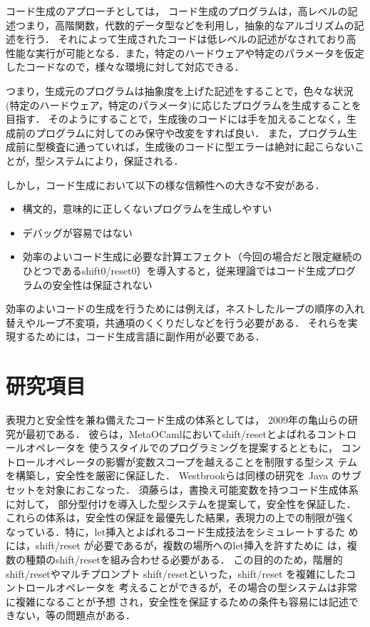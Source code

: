 \documentclass[10pt,a4j,twocolumn]{jarticle}
\theoremstyle{definition}
\begin{document}
コード生成のアプローチとしては，
コード生成のプログラムは，高レベルの記述つまり，高階関数，代数的データ型などを利用し，抽象的なアルゴリズムの記述を行う．
それによって生成されたコードは低レベルの記述がなされており高性能な実行が可能となる．また，特定のハードウェアや特定のパラメータを仮定したコードなので，様々な環境に対して対応できる．

つまり，生成元のプログラムは抽象度を上げた記述をすることで，色々な状況(特定のハードウェア，特定のパラメータ)に応じたプログラムを生成することを目指す．
そのようにすることで，生成後のコードには手を加えることなく，生成前のプログラムに対してのみ保守や改変をすれば良い．
また，プログラム生成前に型検査に通っていれば，生成後のコードに型エラーは絶対に起こらないことが，型システムにより，保証される．

しかし，コード生成において以下の様な信頼性への大きな不安がある．

\begin{itemize}
\item 構文的，意味的に正しくないプログラムを生成しやすい
\item デバッグが容易ではない
\item 効率のよいコード生成に必要な計算エフェクト（今回の場合だと限定継続のひとつであるshift0/reset0）を導入すると，従来理論ではコード生成プログラムの安全性は保証されない
\end{itemize}

効率のよいコードの生成を行うためには例えば，ネストしたループの順序の入れ替えやループ不変項，共通項のくくりだしなどを行う必要がある．
それらを実現するためには，コード生成言語に副作用が必要である．

\section{研究項目}
表現力と安全性を兼ね備えたコード生成の体系としては，
2009年の亀山らの研究\cite{Kameyama2009}が最初である．
彼らは，MetaOCamlにおいてshift/resetとよばれるコントロールオペレータを
使うスタイルでのプログラミングを提案するとともに，
コントロールオペレータの影響が変数スコープを越えることを制限する型シス
テムを構築し，安全性を厳密に保証した．
Westbrookら\cite{Westbrook}は同様の研究を Java のサブセットを対象におこなった．
須藤ら\cite{Sudo2014}は，書換え可能変数を持つコード生成体系に対して，
部分型付けを導入した型システムを提案して，安全性を保証した．
これらの体系は，安全性の保証を最優先した結果，表現力の上での制限が強く
なっている．特に，let挿入とよばれるコード生成技法をシミュレートするた
めには，shift/reset が必要であるが，複数の場所へのlet挿入を許すために
は，複数の種類のshift/resetを組み合わせる必要がある．
この目的のため，階層的shift/resetやマルチプロンプト
shift/resetといった，shift/reset を複雑にしたコントロールオペレータを
考えることができるが，その場合の型システムは非常に複雑になることが予想
され，安全性を保証するための条件も容易には記述できない，等の問題点がある．
\end{document}
